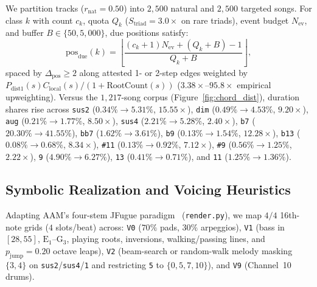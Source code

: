 \documentclass{article}
\begin{document}
We partition tracks ($r_{\text{nat}} = 0.50$) into $2{,}500$ natural and $2{,}500$ targeted songs. For class $k$ with count $c_k$, quota $Q_k$ ($S_{\text{triad}} = 3.0\times$ on rare triads), event budget $N_{\text{ev}}$, and buffer $B \in \{50, 5{,}000\}$, due positions satisfy:
\begin{equation}\label{eq:quota_due}
  \text{pos}_{\text{due}}(k) = \left\lfloor \frac{(c_k + 1) N_{\text{ev}} + (Q_k + B) - 1}{Q_k + B} \right\rfloor,
\end{equation}
spaced by $\Delta_{\text{pos}} \ge 2$ along attested 1- or 2-step edges weighted by $P_{\text{dist1}}(s) C_{\text{local}}(s) / (1 + \text{RootCount}(s))$ ($3.38\times$--$95.8\times$ empirical upweighting). Versus the $1{,}217$-song corpus (Figure~\ref{fig:chord_dist}), duration shares rise across {\small\texttt{sus2}} ($0.34\% \!\to\! 5.31\%$, $15.55\times$), {\small\texttt{dim}} ($0.49\% \!\to\! 4.53\%$, $9.20\times$), {\small\texttt{aug}} ($0.21\% \!\to\! 1.77\%$, $8.50\times$), {\small\texttt{sus4}} ($2.21\% \!\to\! 5.28\%$, $2.40\times$), {\small\texttt{b7}} ($20.30\% \!\to\! 41.55\%$), {\small\texttt{bb7}} ($1.62\% \!\to\! 3.61\%$), {\small\texttt{b9}} ($0.13\% \!\to\! 1.54\%$, $12.28\times$), {\small\texttt{b13}} ($0.08\% \!\to\! 0.68\%$, $8.34\times$), {\small\texttt{\#11}} ($0.13\% \!\to\! 0.92\%$, $7.12\times$), {\small\texttt{\#9}} ($0.56\% \!\to\! 1.25\%$, $2.22\times$), {\small\texttt{9}} ($4.90\% \!\to\! 6.27\%$), {\small\texttt{13}} ($0.41\% \!\to\! 0.71\%$), and {\small\texttt{11}} ($1.25\% \!\to\! 1.36\%$).

\subsection{Symbolic Realization and Voicing Heuristics}\label{subsec:voicing}

Adapting AAM's four-stem JFugue paradigm~\cite{ostermann2023aam} ({\small\texttt{render.py}}), we map $4/4$ 16th-note grids ($4$ slots/beat) across: {\small\texttt{V0}} ($70\%$ pads, $30\%$ arpeggios), {\small\texttt{V1}} (bass in $[28, 55]$, $\text{E}_1$--$\text{G}_3$, playing roots, inversions, walking/passing lines, and $p_{\text{jump}} = 0.20$ octave leaps), {\small\texttt{V2}} (beam-search or random-walk melody masking $\{3, 4\}$ on {\small\texttt{sus2}}/{\small\texttt{sus4}}/{\small\texttt{1}} and restricting {\small\texttt{5}} to $\{0, 5, 7, 10\}$), and {\small\texttt{V9}} (Channel~10 drums).
\end{document}
